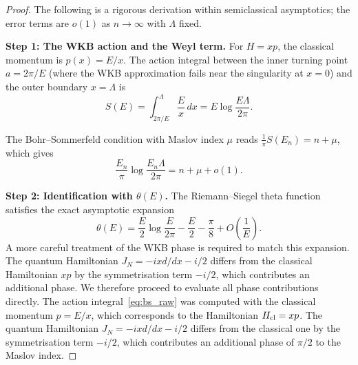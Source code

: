 \documentclass{pre-aomart}
\theoremstyle{plain}
\theoremstyle{definition}
\theoremstyle{remark}
\begin{document}
\begin{proof}
The following is a rigorous derivation within semiclassical asymptotics;
the error terms are $o(1)$ as $n \to \infty$ with $\Lambda$ fixed.

\textbf{Step 1: The WKB action and the Weyl term.}
For $H = xp$, the classical momentum is $p(x) = E/x$.  The action integral
between the inner turning point $a = 2\pi/E$ (where the WKB approximation
fails near the singularity at $x = 0$) and the outer boundary $x = \Lambda$ is
\[
S(E) = \int_{2\pi/E}^{\Lambda} \frac{E}{x}\,dx
      = E \log\frac{E\Lambda}{2\pi}.
\]

The Bohr--Sommerfeld condition with Maslov index $\mu$ reads
$\frac{1}{\pi}S(E_n) = n + \mu$, which gives
\begin{equation}\label{eq:bs_raw}
\frac{E_n}{\pi}\log\frac{E_n\Lambda}{2\pi}
      = n + \mu + o(1).
\end{equation}

\textbf{Step 2: Identification with $\theta(E)$.}
The Riemann--Siegel theta function satisfies the exact asymptotic expansion
\[
\theta(E) = \frac{E}{2}\log\frac{E}{2\pi} - \frac{E}{2}
            - \frac{\pi}{8} + O\!\left(\frac{1}{E}\right).
\]
A more careful treatment of the WKB phase is required to match this expansion.
The quantum Hamiltonian $J_N = -i x d/dx - i/2$ differs from the classical
Hamiltonian $xp$ by the symmetrisation term $-i/2$, which contributes an
additional phase.  We therefore proceed to evaluate all phase contributions
directly.
The action integral~\eqref{eq:bs_raw} was computed with the classical
momentum $p = E/x$, which corresponds to the Hamiltonian $H_{\rm cl} = xp$.
The quantum Hamiltonian $J_N = -i x d/dx - i/2$ differs from the
classical one by the symmetrisation term $-i/2$, which contributes an
additional phase of $\pi/2$ to the Maslov index.


\end{proof}
\end{document}
